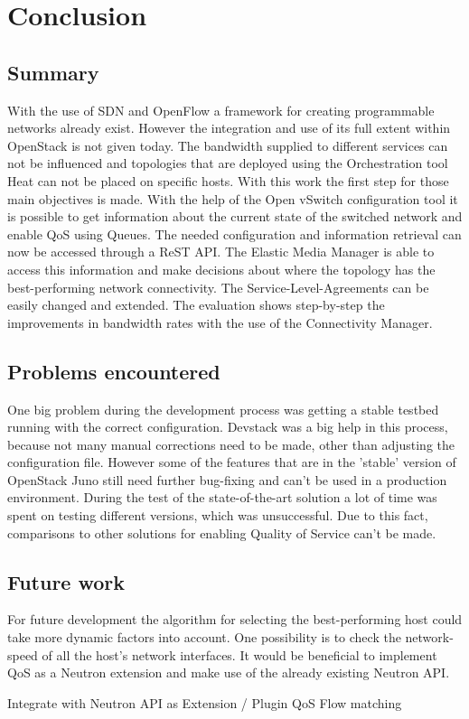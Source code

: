  \cleardoublepage
\chapter{Conclusion}

\section{Summary}

With the use of SDN and OpenFlow a framework for creating programmable networks already exist. However the integration and use of its full extent within OpenStack is not given today. The bandwidth supplied to different services can not be influenced and topologies that are deployed using the Orchestration tool Heat can not be placed on specific hosts. With this work the first step for those main objectives is made. With the help of the Open vSwitch configuration tool it is possible to get information about the current state of the switched network and enable QoS using Queues. The needed configuration and information retrieval can now be accessed through a ReST API. The Elastic Media Manager is able to access this information and make decisions about where the topology has the best-performing network connectivity. The Service-Level-Agreements can be easily changed and extended. The evaluation shows step-by-step the improvements in bandwidth rates with the use of the Connectivity Manager.

\section{Problems encountered}

One big problem during the development process was getting a stable testbed running with the correct configuration. Devstack was a big help in this process, because not many manual corrections need to be made, other than adjusting the configuration file. However some of the features that are in the 'stable' version of OpenStack Juno still need further bug-fixing and can't be used in a production environment. During the test of the state-of-the-art solution a lot of time was spent on testing different versions, which was unsuccessful. Due to this fact, comparisons to other solutions for enabling Quality of Service can't be made. 

\section{Future work}

For future development the algorithm for selecting the best-performing host could take more dynamic factors into account. One possibility is to check the network-speed of all the host's network interfaces. It would be beneficial to implement QoS as a Neutron extension and make use of the already existing Neutron API. 

Integrate with Neutron API as Extension / Plugin
QoS Flow matching